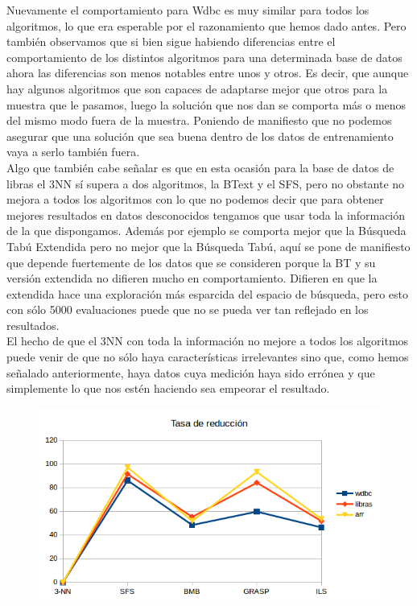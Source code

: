 \documentclass[10pt,a4paper]{article}
\begin{document}
Nuevamente el comportamiento para Wdbc es muy similar para todos los algoritmos, lo que era esperable por el razonamiento que hemos dado antes. Pero también observamos que si bien sigue habiendo diferencias entre el comportamiento de los distintos algoritmos para una determinada base de datos ahora las diferencias son menos notables entre unos y otros. Es decir, que aunque hay algunos algoritmos que son capaces de adaptarse mejor que otros para la muestra que le pasamos, luego la solución que nos dan se comporta más o menos del mismo modo fuera de la muestra. Poniendo de manifiesto que no podemos asegurar que una solución que sea buena dentro de los datos de entrenamiento vaya a serlo también fuera.\\

Algo que también cabe señalar es que en esta ocasión para la base de datos de libras el 3NN sí supera a dos algoritmos, la BText y el SFS, pero no obstante no mejora a todos los algoritmos con lo que no podemos decir que para obtener mejores resultados en datos desconocidos tengamos que usar toda la información de la que dispongamos. Además por ejemplo se comporta mejor que la Búsqueda Tabú Extendida pero no mejor que la Búsqueda Tabú, aquí se pone de manifiesto que depende fuertemente de los datos que se consideren porque la BT y su versión extendida no difieren mucho en comportamiento. Difieren en que la extendida hace una exploración más esparcida del espacio de búsqueda, pero esto con sólo 5000 evaluaciones puede que no se pueda ver tan reflejado en los resultados.\\

El hecho de que el 3NN con toda la información no mejore a todos los algoritmos puede venir de que no sólo haya características irrelevantes sino que, como hemos señalado anteriormente, haya datos cuya medición haya sido errónea y que simplemente lo que nos estén haciendo sea empeorar el resultado.\\

\begin{figure}[H]
\centering
\includegraphics[width=130mm]{reduccion.png}
\end{figure}
\end{document}
